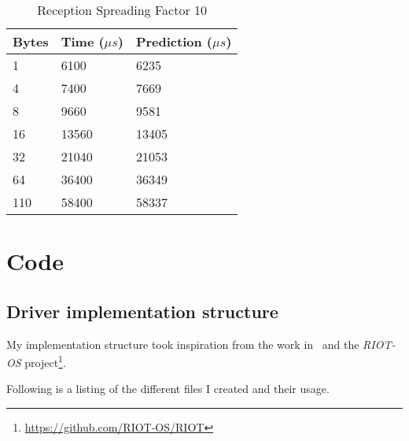 \begin{table}[H]
\centering
\begin{tabular}{@{}lll@{}}
\toprule
\multicolumn{1}{|c|}{\cellcolor[HTML]{C0C0C0}Bytes} & Time ($\mu s$) & Prediction ($\mu s$) \\ \midrule
1                                                   & 6100      & 6235       \\
4                                                   & 7400      & 7669       \\
8                                                   & 9660      & 9581       \\
16                                                  & 13560     & 13405      \\
32                                                  & 21040     & 21053      \\
64                                                  & 36400     & 36349      \\
110                                                 & 58400     & 58337      \\ \bottomrule
\end{tabular}
\caption{Reception Spreading Factor 10\label{table:rxsf10}}
\end{table}

\chapter{Code}

\section{Driver implementation structure\label{appendix:driver}}

My implementation structure took inspiration from the work
in~\cite{8847137} and the \emph{RIOT-OS}
project\footnote{\url{https://github.com/RIOT-OS/RIOT}}.

Following is a listing of the different files I created and their
usage. %

